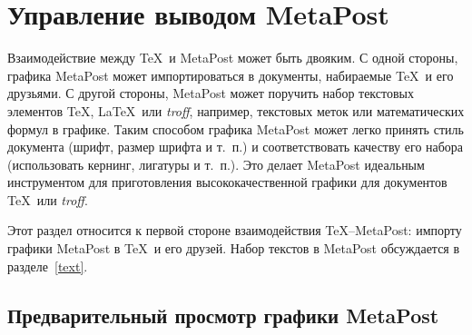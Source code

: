 \documentclass{article} %
\begin{document}
\section{Управление выводом MetaPost}
\label{Dmpoutput}

Взаимодействие между \TeX\ и MetaPost может быть двояким.
С одной стороны, графика MetaPost может импортироваться в документы, 
набираемые \TeX\ и его друзьями. 
С другой стороны, MetaPost может поручить набор текстовых элементов \TeX, 
\LaTeX\ или \emph{troff}, например, текстовых меток или математических 
формул в графике.
Таким способом графика MetaPost может легко принять стиль документа 
(шрифт, размер шрифта и т.~п.) и соответствовать качеству его набора 
(использовать кернинг, лигатуры и т.~п.).
Это делает MetaPost идеальным инструментом для приготовления высококачественной 
графики для документов \TeX\ или \emph{troff}.

Этот раздел относится к первой стороне взаимодействия \TeX--MetaPost: 
импорту графики MetaPost в \TeX\ и его друзей.
Набор текстов в MetaPost обсуждается в разделе~\ref{text}.

\subsection{Предварительный просмотр графики MetaPost}
\end{document}
